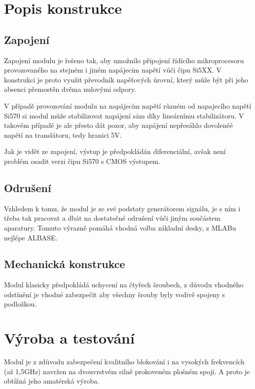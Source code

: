\documentclass[12pt,a4paper,twoside]{article}
\begin{document}
\newpage
\section{Popis konstrukce}
\subsection{Zapojení}
Zapojení modulu je řešeno tak, aby umožnilo připojení řídícího mikroprocesoru provozovaného na stejném i jiném napájecím napětí vůči čipu Si5XX. V konstrukci je proto využit převodník napěťových úrovní, který může být při jeho absenci přemostěn dvěma nulovými odpory.

V případě provozování modulu na napájecím napětí různém od napajecího napětí Si570 si modul může stabilizovat napájení sám díky lineárnímu stabilizátoru. V takovém případě je ale přesto dát pozor, aby napájení nepřesáhlo dovolenéé napětí na translátoru, tedy hranici 5V.  



Jak je vidět ze zapojení, výstup je předpokládán diferenciální, avšak není problém osadit verzi čipu Si570 s CMOS výstupem. 

\subsection{Odrušení}

Vzhledem k tomu, že modul je ze své podstaty generátorem signálu, je s ním i třeba tak pracovat a dbát na dostatečné odrušení vůči jiným součástem aparatury. Tomuto výrazně pomáhá vhodná volba základní desky, z MLABu nejlépe ALBASE.

\subsection{Mechanická konstrukce}

Modul klasicky předpokládá uchycení na čtyřech šroubech, z důvodu vhodného odstínění je vhodné zabezpečit aby všechny šrouby byly vodivě spojeny s podložkou.  

\section{Výroba a testování}
Modul je z zdůvodu zabezpečení kvalitního blokování i na vysokých frekvencích (až 1,5GHz) navržen na dvouvrstvém silně prokoveném plošném spoji. A proto je obtížná jeho amatérská výroba.
\end{document}

